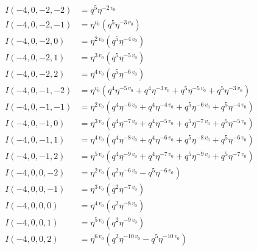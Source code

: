 \documentclass{article}
\begin{document}

\begin{align*}
I(-4, 0, -2, -2) &= q^{5} \eta^{-2 \, v_{0}} \\
I(-4, 0, -2, -1) &= \eta^{v_{0}} \left( q^{5} \eta^{-3 \, v_{0}} \right) \\
I(-4, 0, -2, 0) &= \eta^{2 \, v_{0}} \left( q^{5} \eta^{-4 \, v_{0}} \right) \\
I(-4, 0, -2, 1) &= \eta^{3 \, v_{0}} \left( q^{5} \eta^{-5 \, v_{0}} \right) \\
I(-4, 0, -2, 2) &= \eta^{4 \, v_{0}} \left( q^{5} \eta^{-6 \, v_{0}} \right) \\
I(-4, 0, -1, -2) &= \eta^{v_{0}} \left( q^{4} \eta^{-5 \, v_{0}} + q^{4} \eta^{-3 \, v_{0}} + q^{5} \eta^{-5 \, v_{0}} + q^{5} \eta^{-3 \, v_{0}} \right) \\
I(-4, 0, -1, -1) &= \eta^{2 \, v_{0}} \left( q^{4} \eta^{-6 \, v_{0}} + q^{4} \eta^{-4 \, v_{0}} + q^{5} \eta^{-6 \, v_{0}} + q^{5} \eta^{-4 \, v_{0}} \right) \\
I(-4, 0, -1, 0) &= \eta^{3 \, v_{0}} \left( q^{4} \eta^{-7 \, v_{0}} + q^{4} \eta^{-5 \, v_{0}} + q^{5} \eta^{-7 \, v_{0}} + q^{5} \eta^{-5 \, v_{0}} \right) \\
I(-4, 0, -1, 1) &= \eta^{4 \, v_{0}} \left( q^{4} \eta^{-8 \, v_{0}} + q^{4} \eta^{-6 \, v_{0}} + q^{5} \eta^{-8 \, v_{0}} + q^{5} \eta^{-6 \, v_{0}} \right) \\
I(-4, 0, -1, 2) &= \eta^{5 \, v_{0}} \left( q^{4} \eta^{-9 \, v_{0}} + q^{4} \eta^{-7 \, v_{0}} + q^{5} \eta^{-9 \, v_{0}} + q^{5} \eta^{-7 \, v_{0}} \right) \\
I(-4, 0, 0, -2) &= \eta^{2 \, v_{0}} \left( q^{2} \eta^{-6 \, v_{0}} - q^{5} \eta^{-6 \, v_{0}} \right) \\
I(-4, 0, 0, -1) &= \eta^{3 \, v_{0}} \left( q^{2} \eta^{-7 \, v_{0}} \right) \\
I(-4, 0, 0, 0) &= \eta^{4 \, v_{0}} \left( q^{2} \eta^{-8 \, v_{0}} \right) \\
I(-4, 0, 0, 1) &= \eta^{5 \, v_{0}} \left( q^{2} \eta^{-9 \, v_{0}} \right) \\
I(-4, 0, 0, 2) &= \eta^{6 \, v_{0}} \left( q^{2} \eta^{-10 \, v_{0}} - q^{5} \eta^{-10 \, v_{0}} \right) \\

\end{align*}
\end{document}
